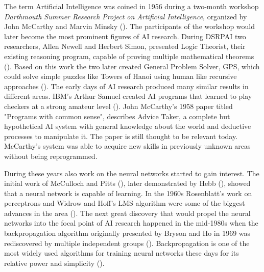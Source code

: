 The term Artificial Intelligence was coined in 1956 during a two-month workshop
\emph{Darthmouth Summer Research Project on Artificial Intelligence}, organized
by John McCarthy and Marvin Minsky (\cite{kaplan2019}). The participants of the
workshop would later become the most prominent figures of AI research. During
DSRPAI two researchers, Allen Newell and Herbert Simon, presented Logic
Theorist, their existing reasoning program, capable of proving multiple
mathematical theorems (\cite{norvig2002}). Based on this work the two later
created General Problem Solver, GPS, which could solve simple puzzles like
Towers of Hanoi using human like recursive approaches (\cite{newell1959}). The
early days of AI research produced many similar results in different areas.
IBM's Arthur Samuel created AI programs that learned to play checkers at a
strong amateur level (\cite{norvig2002}). John McCarthy's 1958 paper titled
"Programs with common sense", describes Advice Taker, a complete but
hypothetical AI system with general knowledge about the world and deductive
processes to manipulate it. The paper is still thought to be relevant today.
McCarthy's system was able to acquire new skills in previously unknown areas
without being reprogrammed.

During these years also work on the neural networks started to gain interest.
The initial work of McCulloch and Pitts (\cite*{mcculloch1943}), later
demonstrated by Hebb (\cite{norvig2002}), showed that a neural network is
capable of learning. In the 1960s Rosenblatt's work on perceptrons and Widrow
and Hoff's LMS algorithm were some of the biggest advances in the area
(\cite{widrow1995}). The next great discovery that would propel the neural
networks into the focal point of AI research happened in the mid-1980s when the
backpropagation algorithm originally presented by Bryson and Ho in 1969 was
rediscovered by multiple independent groups (\cite{norvig2002}). Backpropagation
is one of the most widely used algorithms for training neural networks these
days for its relative power and simplicity (\cite{rumelhart1995}).

